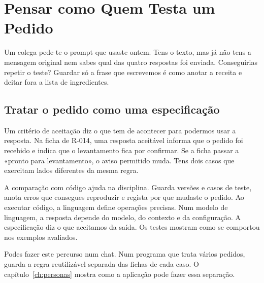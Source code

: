 \chapter{Pensar como Quem Testa um Pedido}
\label{ch:mentalidade}
Um colega pede-te o prompt que usaste ontem. Tens o texto, mas já não tens a mensagem original nem sabes qual das quatro respostas foi enviada. Conseguirias repetir o teste? Guardar só a frase que escrevemos é como anotar a receita e deitar fora a lista de ingredientes.

\section{Tratar o pedido como uma especificação}
Um critério de aceitação diz o que tem de acontecer para podermos usar a resposta. Na ficha de R-014, uma resposta aceitável informa que o pedido foi recebido e indica que o levantamento fica por confirmar. Se a ficha passar a «pronto para levantamento», o aviso permitido muda. Tens dois casos que exercitam lados diferentes da mesma regra.

A comparação com código ajuda na disciplina. Guarda versões e casos de teste, anota erros que consegues reproduzir e regista por que mudaste o pedido. Ao executar código, a linguagem define operações precisas. Num modelo de linguagem, a resposta depende do modelo, do contexto e da configuração. A especificação diz o que aceitamos da saída. Os testes mostram como se comportou nos exemplos avaliados.

Podes fazer este percurso num chat. Num programa que trata vários pedidos, guarda a regra reutilizável separada das fichas de cada caso. O capítulo~\ref{ch:personas} mostra como a aplicação pode fazer essa separação.


